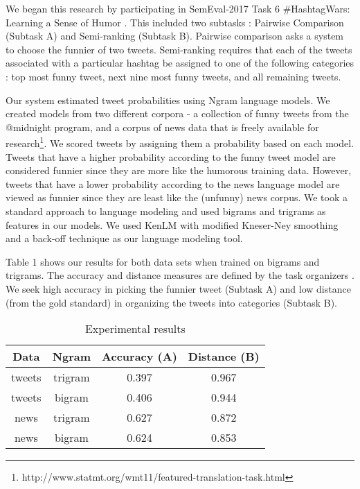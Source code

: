 \documentclass[11pt,a4paper]{article}
\begin{document}
We began this research by participating in SemEval-2017 Task 6 
\#HashtagWars: Learning a Sense of Humor \cite{PotashRR17}. This included
two subtasks : Pairwise Comparison (Subtask A) and Semi-ranking 
(Subtask B). Pairwise comparison asks a system to choose the funnier of
two tweets. Semi-ranking requires that each of the tweets
associated with a particular hashtag be assigned to one of the 
following categories : top most funny tweet, next nine most funny
tweets, and all remaining tweets. 


Our system
estimated tweet probabilities using Ngram language models.
We created models
from two different corpora - a collection of funny tweets from the @midnight
program, and a corpus of news data that is freely available for 
research\footnote{http://www.statmt.org/wmt11/featured-translation-task.html}. 
We scored tweets by assigning them a probability based on each 
model. Tweets that have a higher probability according to the funny 
tweet model are considered funnier since they are more like the humorous
training data. However, tweets 
that have a lower probability according to the news language model 
are viewed as funnier since they are least like the (unfunny) news corpus.
We took a standard approach to language modeling and used bigrams 
and trigrams as features in our models. We used KenLM \cite{HeafieldPCK13} 
with modified Kneser-Ney smoothing and a back-off technique as our language 
modeling tool. 

Table 1 shows our results for both data sets when trained on 
bigrams and trigrams. The accuracy and distance measures
are defined by the task organizers \cite{PotashRR17}. We seek 
high accuracy in picking the funnier tweet (Subtask A) and low
distance (from the gold standard) in organizing the tweets into 
categories (Subtask B). 

\begin{table}[h]
\begin{center}
\begin{tabular}{cccc}
\hline
Data & Ngram & Accuracy (A) & Distance (B) \\
\hline
tweets & trigram & 0.397 & 0.967 \\
tweets & bigram & 0.406 & 0.944 \\
news & trigram & 0.627 & 0.872 \\
news & bigram & 0.624 & 0.853 \\
\end{tabular}
\caption{Experimental results}
\end{center}
\end{table}
\end{document}
